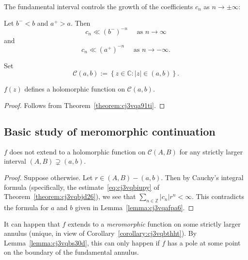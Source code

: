 \documentclass[reqno]{amsart}  \numberwithin{theorem}{section} \numberwithin{equation}{section}
\begin{document}
The fundamental interval controls the growth of the coefficients $c_n$ as $n \rightarrow \pm \infty$:
\begin{lemma}
  Let $b^- < b$ and $a^+ > a$.  Then
  \begin{equation*}
    c_n \ll {(b^-)}^{-n} \quad \text{ as } n \rightarrow \infty
  \end{equation*}
  and
  \begin{equation*}
    c_n \ll {(a^+)}^{-n} \quad \text{ as } n \rightarrow -\infty.
  \end{equation*}
\end{lemma}

Set
\begin{equation*}
  \mathcal{C} (a, b) := \left\{ z \in \mathbb{C} : \lvert z  \rvert \in (a,b) \right\}.
\end{equation*}

\begin{lemma}
  $f(z)$ defines a holomorphic function on $\mathcal{C}(a,b)$.
\end{lemma}
\begin{proof}
  Follows from Theorem~\ref{theorem:cj3vqa91ti}.
\end{proof}

\subsection{Basic study of meromorphic continuation}

\begin{lemma}\label{lemma:cj3vqbs30d}
  $f$ does not extend to a holomorphic function on $\mathcal{C}(A,B)$ for any strictly larger interval $(A,B) \supsetneq (a,b)$.
\end{lemma}
\begin{proof}
  Suppose otherwise.  Let $r \in (A,B) - (a,b)$.  Then by Cauchy's integral formula (specifically, the estimate~\eqref{eq:cj3vqbiupy} of Theorem~\ref{theorem:cj3vqbjd26}), we see that $\sum_{n \in \mathbb{Z}} \lvert c_n \rvert r^n < \infty$.  This contradicts the formula for $a$ and $b$ given in Lemma~\ref{lemma:cj3vqafpa6}.
\end{proof}

\begin{note}
  It can happen that $f$ extends to a \emph{meromorphic} function on some strictly larger annulus (unique, in view of Corollary~\ref{corollary:cj3vqbthht}).  By Lemma~\ref{lemma:cj3vqbs30d}, this can only happen if $f$ has a pole at some point on the boundary of the fundamental annulus.
\end{note}
\end{document}
